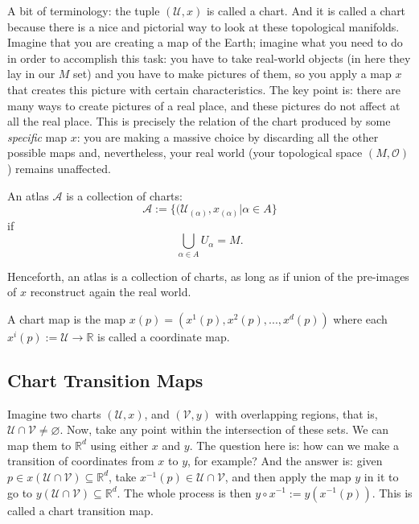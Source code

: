 A bit of terminology: the tuple $(\mathcal{U}, x)$ is called a chart. And it is called a chart because there is a nice and pictorial way to look at these topological manifolds. Imagine that you are creating a map of the Earth; imagine what you need to do in order to accomplish this task: you have to take real-world objects (in here they lay in our $M$ set) and you have to make pictures of them, so you apply a map $x$ that creates this picture with certain characteristics. The key point is: there are many ways to create pictures of a real place, and these pictures do not affect at all the real place. This is precisely the relation of the chart produced by some \emph{specific} map $x$: you are making a massive choice by discarding all the other possible maps and, nevertheless, your real world (your topological space $(M, \mathcal{O})$) remains unaffected.

\begin{definition}
    An atlas $\mathcal{A}$ is a collection of charts:
    \[
        \mathcal{A} := \{ (\mathcal{U}_{(\alpha)}, x_{(\alpha)} | \alpha \in A \}
    \]
    if
    \[
        \bigcup_{\alpha \in A} U_\alpha = M.
    \]
\end{definition}

Henceforth, an atlas is a collection of charts, as long as if union of the pre-images of $x$ reconstruct again the real world.

\begin{definition}
    A chart map is the map $x(p) = (x^1(p), x^2(p), ..., x^d(p))$ where each $x^i(p) := \mathcal{U} \longrightarrow \mathbb{R}$ is called a coordinate map.
\end{definition}

\subsection{Chart Transition Maps}

Imagine two charts $(\mathcal{U}, x)$, and $(\mathcal{V}, y)$ with overlapping regions, that is, $\mathcal{U} \cap \mathcal{V} \neq \varnothing$. Now, take any point within the intersection of these sets. We can map them to $\mathbb{R}^d$ using either $x$ and $y$. The question here is: how can we make a transition of coordinates from $x$ to $y$, for example? And the answer is: given $p \in x(\mathcal{U \cap \mathcal{V}}) \subseteq \mathbb{R}^d$, take $x^{-1}(p) \in \mathcal{U} \cap \mathcal{V}$, and then apply the map $y$ in it to go to $y(\mathcal{U \cap \mathcal{V}}) \subseteq \mathbb{R}^d$. The whole process is then $y \circ x^{-1} := y(x^{-1}(p))$. This is called a chart transition map.

